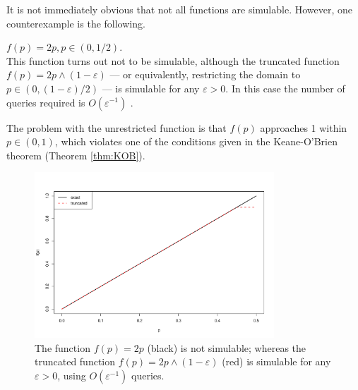\documentclass{article}
\theoremstyle{definition}
\newenvironment{example}
  {\pushQED{\qed}\renewcommand{\qedsymbol}{$\triangle$}\examplex}
  {\popQED\endexamplex}
\begin{document}
It is not immediately obvious that not all functions are simulable. However, one counterexample is the following.

\begin{example}\label{ex:2p}
$f(p) = 2p, p\in(0,1/2)$.\\
This function turns out not to be simulable, although the truncated function $f(p) = 2p \wedge (1-\varepsilon)$ --- or equivalently, restricting the domain to $p\in(0,(1 - \varepsilon)/2)$ --- is simulable for any $\varepsilon>0$. In this case the number of queries required is $O(\varepsilon ^{-1})$ \citep{huber2016}.

The problem with the unrestricted function is that $f(p)$ approaches 1 within $p\in(0,1)$, which violates one of the conditions given in the Keane-O'Brien theorem (Theorem \ref{thm:KOB}).
\begin{figure}
\centering
\includegraphics[width=0.8\textwidth]{2p_truncation.pdf}
\caption{The function $f(p)=2p$ (black) is not simulable; whereas the truncated function $f(p)=2p\wedge (1-\varepsilon)$ (red) is simulable for any $\varepsilon>0$, using $O(\varepsilon^{-1})$ queries.}
\label{fig:2p_truncation}
\end{figure}
\end{example}
\end{document}
